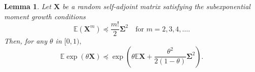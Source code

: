 \documentclass[11pt,letterpaper,twoside,reqno,nosumlimits]{amsart}
\renewcommand{\star}{*}
\newcommand{\mat}[1]{\ensuremath{\bm{#1}}} %
\renewcommand{\vec}[1]{\ensuremath{\bm{#1}}}
\newcommand{\E}{\ensuremath{\mathbb{E}}}
\newcommand{\Isom}[2]{\ensuremath{\mathbb{V}_{#1}^{#2}}}
\newtheorem{lemma}[thm]{Lemma}
\theoremstyle{remark}
\numberwithin{equation}{section}
\numberwithin{thm}{section}
\numberwithin{prop}{section}
\numberwithin{defn}{section}
\numberwithin{remark}{section}
\begin{document}
\begin{lemma}
Let $\mat{X}$ be a random self-adjoint matrix satisfying the subexponential moment growth conditions
\[
\E (\mat{X}^m) \preceq \frac{m!}{2} \mat{\Sigma}^2 \quad \text{for } m=2,3,4,\ldots.
\]
Then, for any $\theta$ in $[0,1),$
\[
 \E \exp(\theta \mat{X}) \preceq \exp\left( \theta \E \mat{X} + \frac{\theta^2}{2(1 - \theta)} \mat{\Sigma}^2 \right).
\]
\label{lemma:growthbernsteinmgf}
\end{lemma}

%
% 
% 
% 
% 
\end{document}
